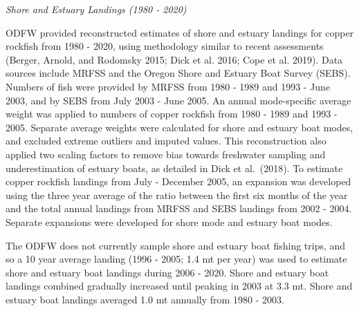 \documentclass[11pt,
  english,
  a4paper,
]{article}
\begin{document}
\leavevmode\tagmcend\tagstructend\par


\emph{Shore and Estuary Landings (1980 - 2020)}

\leavevmode\tagmcend\tagstructend\par


ODFW provided reconstructed estimates of shore and estuary landings for copper rockfish from 1980 - 2020, using methodology similar to recent assessments {(Berger, Arnold, and Rodomsky 2015; Dick et al. 2016; Cope et al. 2019)\leavevmode\tagmcend\tagstructend}. Data sources include MRFSS and the Oregon Shore and Estuary Boat Survey (SEBS). Numbers of fish were provided by MRFSS from 1980 - 1989 and 1993 - June 2003, and by SEBS from July 2003 - June 2005. An annual mode-specific average weight was applied to numbers of copper rockfish from 1980 - 1989 and 1993 - 2005. Separate average weights were calculated for shore and estuary boat modes, and excluded extreme outliers and imputed values. This reconstruction also applied two scaling factors to remove bias towards freshwater sampling and underestimation of estuary boats, as detailed in Dick et al.~{(2018)\leavevmode\tagmcend\tagstructend}. To estimate copper rockfish landings from July - December 2005, an expansion was developed using the three year average of the ratio between the first six months of the year and the total annual landings from MRFSS and SEBS landings from 2002 - 2004. Separate expansions were developed for shore mode and estuary boat modes.

\leavevmode\tagmcend\tagstructend\par


The ODFW does not currently sample shore and estuary boat fishing trips, and so a 10 year average landing (1996 - 2005; 1.4 mt per year) was used to estimate shore and estuary boat landings during 2006 - 2020. Shore and estuary boat landings combined gradually increased until peaking in 2003 at 3.3 mt. Shore and estuary boat landings averaged 1.0 mt annually from 1980 - 2003.

\leavevmode\tagmcend\tagstructend\par
\end{document}
